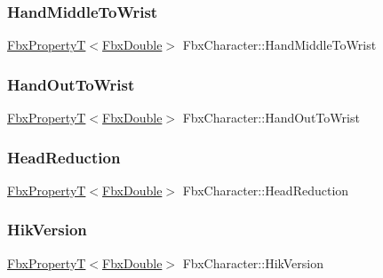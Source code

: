 \mbox{\label{class_fbx_character_a30e904ae4d83a0ee4bdd5ad67085ebb4}} 
\subsubsection{\texorpdfstring{Hand\+Middle\+To\+Wrist}{HandMiddleToWrist}}
{\footnotesize\ttfamily \hyperlink{class_fbx_property_t}{Fbx\+PropertyT}$<$\hyperlink{fbxtypes_8h_a171e72a1c46fc15c1a6c9c31948c1c5b}{Fbx\+Double}$>$ Fbx\+Character\+::\+Hand\+Middle\+To\+Wrist}

\mbox{\label{class_fbx_character_a8d6319089637fd340baeead343320f79}} 
\subsubsection{\texorpdfstring{Hand\+Out\+To\+Wrist}{HandOutToWrist}}
{\footnotesize\ttfamily \hyperlink{class_fbx_property_t}{Fbx\+PropertyT}$<$\hyperlink{fbxtypes_8h_a171e72a1c46fc15c1a6c9c31948c1c5b}{Fbx\+Double}$>$ Fbx\+Character\+::\+Hand\+Out\+To\+Wrist}

\mbox{\label{class_fbx_character_a3261e15fba332932c44dca19271d7949}} 
\subsubsection{\texorpdfstring{Head\+Reduction}{HeadReduction}}
{\footnotesize\ttfamily \hyperlink{class_fbx_property_t}{Fbx\+PropertyT}$<$\hyperlink{fbxtypes_8h_a171e72a1c46fc15c1a6c9c31948c1c5b}{Fbx\+Double}$>$ Fbx\+Character\+::\+Head\+Reduction}

\mbox{\label{class_fbx_character_a8a71e81731d16cc1d217a44125775047}} 
\subsubsection{\texorpdfstring{Hik\+Version}{HikVersion}}
{\footnotesize\ttfamily \hyperlink{class_fbx_property_t}{Fbx\+PropertyT}$<$\hyperlink{fbxtypes_8h_a171e72a1c46fc15c1a6c9c31948c1c5b}{Fbx\+Double}$>$ Fbx\+Character\+::\+Hik\+Version}

